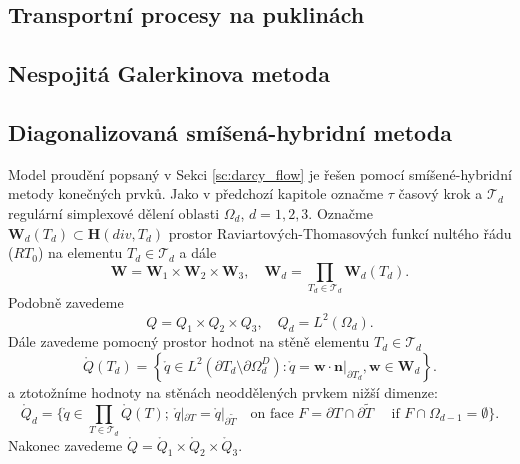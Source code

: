\documentclass[11pt]{report}
\def\vc#1{\mathbf{\boldsymbol{#1}}}     %
\begin{document}
\subsection{Transportní procesy na puklinách}
\label{sc:ad_on_fractures}




\subsection{Nespojitá Galerkinova metoda}


\subsection{Diagonalizovaná smíšená-hybridní metoda}
\def\mr{\mathring}
Model proudění popsaný v Sekci \ref{sc:darcy_flow} je řešen pomocí 
smíšené-hybridní metody konečných prvků. Jako v předchozí kapitole označme 
$\tau$ časový krok a $\mathcal T_d$ regulární simplexové dělení oblasti 
$\Omega_d$, $d=1,2,3$. Označme $\vc W_d(T_d)\subset \vc H(div,T_d)$ prostor 
Raviartových-Thomasových funkcí nultého řádu ($RT_0$) na elementu $T_d\in 
\mathcal T_d$ a dále 
\[
    \vc W =  \vc W_1 \times \vc W_2 \times \vc W_3,\quad
    \vc W_d = \prod_{T_d\in \mathcal T_d} \vc W_d(T_d).
\]
Podobně zavedeme
\begin{equation}
Q=Q_{1}\times Q_{2}\times Q_{3},
\quad
Q_{d}=L^{2}\left(  \Omega_{d}\right).
\end{equation}
Dále zavedeme pomocný prostor hodnot na stěně elementu $T_d\in \mathcal T_d$
\begin{equation}
    \mr Q(T_d)=\left\{  \mr q\in 
    L^{2}(\partial T_d \setminus  \partial\Omega_d^D):
    \mr q =\vc w\cdot \vc n|_{\partial T_d},
    \vc w\in\vc W_d%
    \right\}.
\end{equation}
a ztotožníme hodnoty na stěnách neoddělených prvkem nižší dimenze:
\begin{equation}
    \mr Q_d=\Big\{
        \mr q\in\prod_{T \in \mathcal T_d} \mr Q(T);
        \ \mr q|_{\partial T}=\mr q|_{\partial \tilde T}%
        \quad\text{on face }F=\partial T\cap\partial \tilde T
        \quad\text{ if }F\cap\Omega_{d-1}=\emptyset
    \Big\}.
\end{equation}
Nakonec zavedeme $\mr Q = \mr Q_1 \times \mr Q_2 \times \mr Q_3$.
\end{document}
